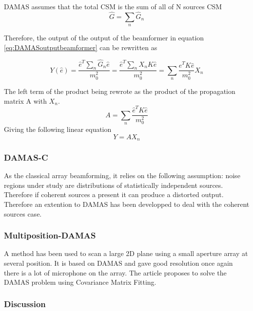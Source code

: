 DAMAS assumes that the total CSM is the sum of all of N sources CSM
\begin{equation}
    \hat{G}=\sum_{n}\hat{G}_{n}
\end{equation}  

Therefore, the output of the output of the beamformer in equation \ref{eq:DAMASoutputbeamformer} can be rewritten as

\begin{equation}
    Y(\hat{e})=\frac{\hat{e}^{T}\sum_{n}\hat{G}_{n}\hat{e}}{m_0^2}=\frac{\hat{e}^{T}\sum_{n}X_{n}K\hat{e}}{m_0^2}=\sum_{n}\frac{\hat{e}^{T}K\hat{e}}{m_0^2} X_{n}
\end{equation}

The left term of the product being rewrote as the product of the propagation matrix A with $X_{n}$.
\begin{equation}
    A=\sum_{n}\frac{\hat{e}^{T}K\hat{e}}{m_0^2}
\end{equation}
Giving the following linear equation
\begin{equation}
    Y = A X_{n}
\end{equation}


\subsubsection{DAMAS-C}

As the classical array beamforming, it relies on the following assumption: noise regions under study are distributions of statistically independent sources. Therefore if coherent sources a present it can produce a distorted output. Therefore an extention to DAMAS has been developped to deal with the coherent sources case.


\subsubsection{Multiposition-DAMAS}

A method has been used to scan a large 2D plane using a small aperture array at several position. It is based on DAMAS and gave good resolution once again there is a lot of microphone on the array. The article proposes to solve the DAMAS problem using Covariance Matrix Fitting.






\subsubsection{Discussion}

